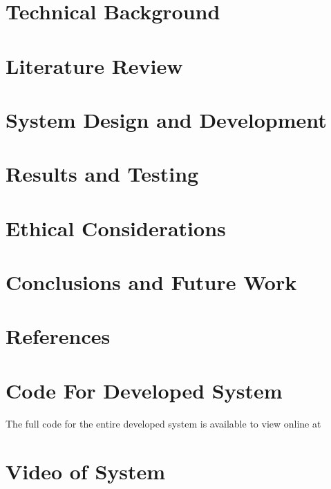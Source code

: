 \documentclass{article}
\begin{document}
\pagebreak
\section{\textbf{Technical Background}} \label{sec:Technical}
\thispagestyle{plain} %

\pagebreak
\section{\textbf{Literature Review}} \label{sec:Lit_Review}
\thispagestyle{plain} %

\pagebreak
\section{\textbf{System Design and Development}} \label{sec:Design_and_Development}
\thispagestyle{plain} %

\pagebreak
\section{\textbf{Results and Testing}} \label{sec:Results_and_testing}
\thispagestyle{plain} %

\pagebreak
\section{\textbf{Ethical Considerations}} \label{sec:Ethics}
\thispagestyle{plain} %

\pagebreak 
\section{Conclusions and Future Work} \label{sec: Conclusions}
\thispagestyle{plain} %


\pagebreak
\section*{References}
\printbibliography[heading=none]
\pagebreak
\appendix
\section{Code For Developed System}
The full code for the entire developed system is available to view online at~\cite{eoin_eoinsheee695-capstone-project-fpga-ids-system_2026}

\pagebreak
\section{Video of System}

\pagebreak

\end{document}

